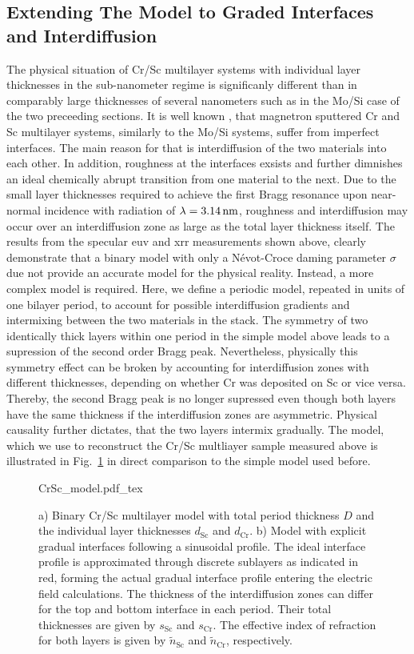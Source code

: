 \subsection{Extending The Model to Graded Interfaces and Interdiffusion}
The physical situation of Cr/Sc multilayer systems with individual layer thicknesses in the sub-nanometer regime is significanly different than in comparably large thicknesses of several nanometers such as in the Mo/Si case of the two preceeding sections. It is well known \cite{prasciolu_thermal_2014}, that magnetron sputtered Cr and Sc multilayer systems, similarly to the Mo/Si systems, suffer from imperfect interfaces. The main reason for that is interdiffusion of the two materials into each other. In addition, roughness at the interfaces exsists and further dimnishes an ideal chemically abrupt transition from one material to the next. Due to the small layer thicknesses required to achieve the first Bragg resonance upon near-normal incidence with radiation of $\lambda=\nm{3.14}$, roughness and interdiffusion may occur over an interdiffusion zone as large as the total layer thickness itself. The results from the specular \gls{euv} and \gls{xrr} measurements shown above, clearly demonstrate that a binary model with only a N\'{e}vot-Croce daming parameter $\sigma$ due not provide an accurate model for the physical reality. Instead, a more complex model is required. Here, we define a periodic model, repeated in units of one bilayer period, to account for possible interdiffusion gradients and intermixing between the two materials in the stack. The symmetry of two identically thick layers within one period in the simple model above leads to a supression of the second order Bragg peak. Nevertheless, physically this symmetry effect can be broken by accounting for interdiffusion zones with different thicknesses, depending on whether Cr was deposited on Sc or vice versa. Thereby, the second Bragg peak is no longer supressed even though both layers have the same thickness if the interdiffusion zones are asymmetric. Physical causality further dictates, that the two layers intermix gradually. The model, which we use to reconstruct the Cr/Sc multliayer sample measured above is illustrated in Fig.~\ref{ch_spec:fig_CrScModel} in direct comparison to the simple model used before.
\begin{figure}[htb]
    \def\svgwidth{\textwidth}
    {CrSc_model.pdf_tex}
    \caption[Binary and gradual Cr/Sc multilayer models.]{a) Binary Cr/Sc multilayer model with total period thickness $D$ and 
the individual layer thicknesses $d_\text{Sc}$ and $d_\text{Cr}$. b) Model with 
explicit gradual interfaces following a sinusoidal profile. The ideal interface 
profile is approximated through discrete sublayers as indicated in red, forming 
the actual gradual interface profile entering the electric field calculations. 
The thickness of the interdiffusion zones can differ for the top and bottom 
interface in each period. Their total thicknesses are given by $s_\text{Sc}$ 
and $s_\text{Cr}$. The effective index of refraction for both layers is given 
by $\tilde{n}_\text{Sc}$ and $\tilde{n}_\text{Cr}$, respectively.}
    \label{ch_spec:fig_CrScModel}
\end{figure}
